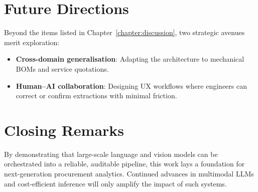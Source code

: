 \section{Future Directions}
Beyond the items listed in Chapter~\ref{chapter:discussion}, two strategic avenues merit exploration:
\begin{itemize}
  \item \textbf{Cross-domain generalisation}: Adapting the architecture to mechanical BOMs and service quotations.
  \item \textbf{Human–AI collaboration}: Designing UX workflows where engineers can correct or confirm extractions with minimal friction.
\end{itemize}

\section{Closing Remarks}
By demonstrating that large-scale language and vision models can be orchestrated into a reliable, auditable pipeline, this work lays a foundation for next-generation procurement analytics.  Continued advances in multimodal LLMs and cost-efficient inference will only amplify the impact of such systems.
